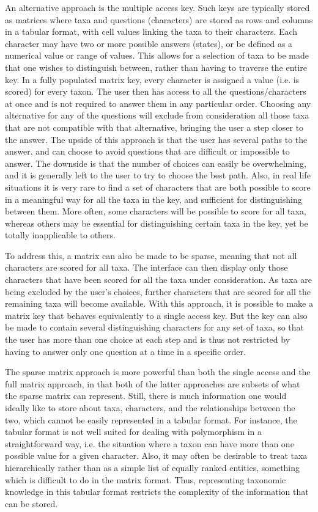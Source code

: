 \documentclass[10pt,letterpaper]{article}
\begin{document}
An alternative approach is the multiple access key. Such keys are typically stored as matrices where taxa and questions (characters) are stored as rows and columns in a tabular format, with cell values linking the taxa to their characters. Each character may have two or more possible answers (states), or be defined as a numerical value or range of values. This allows for a selection of taxa to be made that one wishes to distinguish between, rather than having to traverse the entire key. In a fully populated matrix key, every character is assigned a value (i.e. is scored) for every taxon. The user then has access to all the questions/characters at once and is not required to answer them in any particular order. Choosing any alternative for any of the questions will exclude from consideration all those taxa that are not compatible with that alternative, bringing the user a step closer to the answer. The upside of this approach is that the user has several paths to the answer, and can choose to avoid questions that are difficult or impossible to answer. The downside is that the number of choices can easily be overwhelming, and it is generally left to the user to try to choose the best path. Also, in real life situations it is very rare to find a set of characters that are both possible to score in a meaningful way for all the taxa in the key, and sufficient for distinguishing between them. More often, some characters will be possible to score for all taxa, whereas others may be essential for distinguishing certain taxa in the key, yet be totally inapplicable to others.

To address this, a matrix can also be made to be sparse, meaning that not all characters are scored for all taxa. The interface can then display only those characters that have been scored for all the taxa under consideration. As taxa are being excluded by the user’s choices, further characters that are scored for all the remaining taxa will become available. With this approach, it is possible to make a matrix key that behaves equivalently to a single access key. But the key can also be made to contain several distinguishing characters for any set of taxa, so that the user has more than one choice at each step and is thus not restricted by having to answer only one question at a time in a specific order.

The sparse matrix approach is more powerful than both the single access and the full matrix approach, in that both of the latter approaches are subsets of what the sparse matrix can represent. Still, there is much information one would ideally like to store about taxa, characters, and the relationships between the two, which cannot be easily represented in a tabular format. For instance, the tabular format is not well suited for dealing with polymorphism in a straightforward way, i.e. the situation where a taxon can have more than one possible value for a given character. Also, it may often be desirable to treat taxa hierarchically rather than as a simple list of equally ranked entities, something which is difficult to do in the matrix format. Thus, representing taxonomic knowledge in this tabular format restricts the complexity of the information that can be stored.
\end{document}

